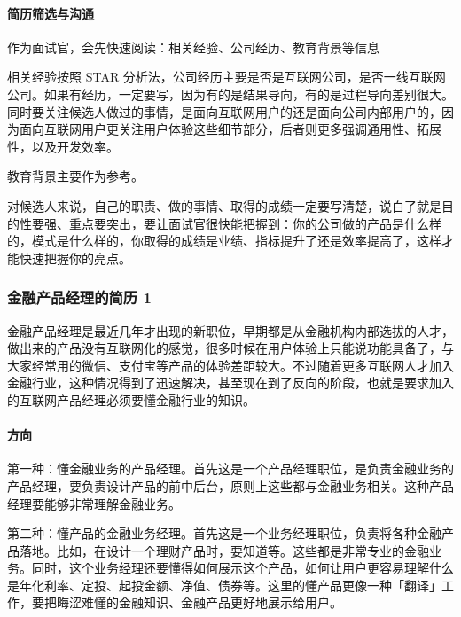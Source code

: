 \documentclass[letterpaper,11pt,english]{sphinxmanual}
\begin{document}
\paragraph{简历筛选与沟通}
\label{\detokenize{chapter_interview/CV:id7}}
作为面试官，会先快速阅读：相关经验、公司经历、教育背景等信息

相关经验按照 STAR
分析法，公司经历主要是否是互联网公司，是否一线互联网公司。如果有经历，一定要写，因为有的是结果导向，有的是过程导向差别很大。同时要关注候选人做过的事情，是面向互联网用户的还是面向公司内部用户的，因为面向互联网用户更关注用户体验这些细节部分，后者则更多强调通用性、拓展性，以及开发效率。

教育背景主要作为参考。

对候选人来说，自己的职责、做的事情、取得的成绩一定要写清楚，说白了就是目的性要强、重点要突出，要让面试官很快能把握到：你的公司做的产品是什么样的，模式是什么样的，你取得的成绩是业绩、指标提升了还是效率提高了，这样才能快速把握你的亮点。


\subsubsection{金融产品经理的简历 1\sphinxfootnotemark[766]}
\label{\detokenize{chapter_interview/AI_Finance_CV:id1}}\label{\detokenize{chapter_interview/AI_Finance_CV::doc}}%
\begin{footnotetext}[766]\sphinxAtStartFootnote
{}
%
\end{footnotetext}\ignorespaces 
金融产品经理是最近几年才出现的新职位，早期都是从金融机构内部选拔的人才，做出来的产品没有互联网化的感觉，很多时候在用户体验上只能说功能具备了，与大家经常用的微信、支付宝等产品的体验差距较大。不过随着更多互联网人才加入金融行业，这种情况得到了迅速解决，甚至现在到了反向的阶段，也就是要求加入的互联网产品经理必须要懂金融行业的知识。


\paragraph{方向}
\label{\detokenize{chapter_interview/AI_Finance_CV:id2}}
第一种：懂金融业务的产品经理。首先这是一个产品经理职位，是负责金融业务的产品经理，要负责设计产品的前中后台，原则上这些都与金融业务相关。这种产品经理要能够非常理解金融业务。

第二种：懂产品的金融业务经理。首先这是一个业务经理职位，负责将各种金融产品落地。比如，在设计一个理财产品时，要知道等。这些都是非常专业的金融业务。同时，这个业务经理还要懂得如何展示这个产品，如何让用户更容易理解什么是年化利率、定投、起投金额、净值、债券等。这里的懂产品更像一种「翻译」工作，要把晦涩难懂的金融知识、金融产品更好地展示给用户。
\end{document}
